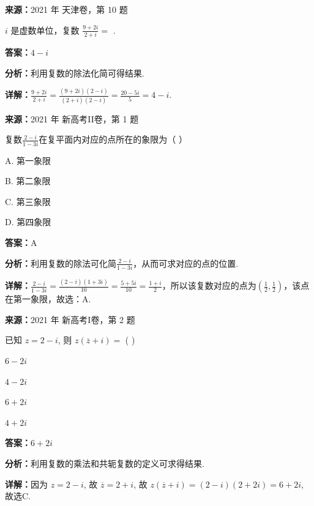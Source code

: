 \begin{question}[points=5]
\textbf{来源：}2021 年 天津卷，第 10 题\par
$i$ 是虚数单位，复数 $\frac{9+2i}{2+i} =$ .
\fillin[{$4-i$}]
\begin{solution}
\textbf{答案：}$4-i$

\textbf{分析：}利用复数的除法化简可得结果.

\textbf{详解：}$\frac{9+2i}{2+i} = \frac{(9+2i)(2-i)}{(2+i)(2-i)} = \frac{20-5i}{5} = 4-i$.
\end{solution}
\end{question}

\begin{question}[points=5]
\textbf{来源：}2021 年 新高考II卷，第 1 题\par
复数$\frac{2-i}{1-3i}$在复平面内对应的点所在的象限为（ ）
\begin{choices}
  \item A. 第一象限
  \item B. 第二象限
  \item C. 第三象限
  \item D. 第四象限
\end{choices}
\begin{solution}
\textbf{答案：}A

\textbf{分析：}利用复数的除法可化简$\frac{2-i}{1-3i}$，从而可求对应的点的位置.

\textbf{详解：}$\frac{2-i}{1-3i}=\frac{(2-i)(1+3i)}{10}=\frac{5+5i}{10}=\frac{1+i}{2}$，所以该复数对应的点为$(\frac{1}{2},\frac{1}{2})$，该点在第一象限，故选：A.
\end{solution}
\end{question}

\begin{question}[points=5]
\textbf{来源：}2021 年 新高考I卷，第 2 题\par
已知 $z = 2 - i$, 则 $z(\overline{z} + i) =$ ( )
\begin{choices}
  \item $6 - 2i$
  \item $4 - 2i$
  \item $6 + 2i$
  \item $4 + 2i$
\end{choices}
\begin{solution}
\textbf{答案：}$6 + 2i$

\textbf{分析：}利用复数的乘法和共轭复数的定义可求得结果.

\textbf{详解：}因为 $z = 2 - i$, 故 $\overline{z} = 2 + i$, 故 $z(\overline{z} + i) = (2 - i)(2 + 2i) = 6 + 2i$, 故选C.
\end{solution}
\end{question}

